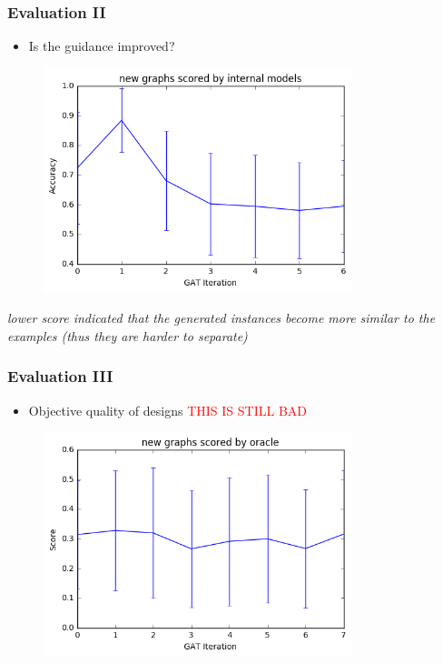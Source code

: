 \documentclass{beamer}
\newcommand{\red}[1]{\textcolor{red}{#1}}
\begin{document}
\begin{frame}
    \frametitle{Evaluation II}
    \begin{itemize}
        \item Is the guidance improved? 
    \end{itemize}

   \begin{figure}[ht]
        \centering
        \includegraphics[width=0.80\textwidth]{images/eval2.png}
    \end{figure}
   \small{\em lower score indicated that the generated instances become more similar
              to the examples (thus they are harder to separate)}
\end{frame}

\begin{frame}
    \frametitle{Evaluation III}
    \begin{itemize}
        \item Objective quality of designs \red{THIS IS STILL BAD}
    \end{itemize}

   \begin{figure}[ht]
        \centering
        \includegraphics[width=0.80\textwidth]{images/eval3.png}
    \end{figure}
\end{frame}
\end{document}
